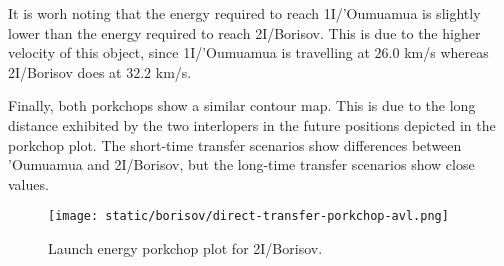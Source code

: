 It is worh noting that the energy required to reach 1I/'Oumuamua is slightly lower
than the energy required to reach 2I/Borisov. This is due to the higher velocity of
this object, since 1I/'Oumuamua is travelling at $26.0$ km/s whereas 2I/Borisov does
at $32.2$ km/s.

Finally, both porkchops show a similar contour map. This is due to the long
distance exhibited by the two interlopers in the future positions depicted in
the porkchop plot. The short-time transfer scenarios show differences between
'Oumuamua and 2I/Borisov, but the long-time transfer scenarios show close values.

\begin{figure}[H]
  \centering
  \texttt{[image: static/borisov/direct-transfer-porkchop-avl.png]}
  \caption{Launch energy porkchop plot for 2I/Borisov.}
  \label{fig:oumuamua-direct-transfer-porkchop}
  \label{fig:borisov-direct-transfer-porkchop-avl}
\end{figure}


